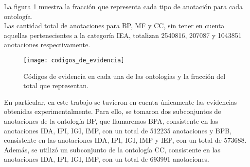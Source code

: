 La figura \ref{fig:codigos_de_evidencia} muestra la fracción que representa cada tipo de anotación para cada ontología.\\
Las cantidad total de anotaciones para BP, MF y CC, sin tener en cuenta aquellas pertenecientes a la categoría IEA, totalizan 2540816, 207087 y 1043851 anotaciones respectivamente.
\begin{figure}[h]
    \centering
    \texttt{[image: codigos\_de\_evidencia]}
    \caption{Códigos de evidencia en cada una de las ontologías y la fracción del total que representan.}
    \label{fig:codigos_de_evidencia}
\end{figure}
En particular, en este trabajo se tuvieron en cuenta únicamente las evidencias obtenidas experimentalmente. Para ello, se tomaron dos subconjuntos de anotaciones de la ontología BP, que llamaremos BPA, consistente en las anotaciones IDA, IPI, IGI, IMP, con un total de 512235 anotaciones y BPB, consistente en las anotaciones IDA, IPI, IGI, IMP y IEP, con un total de 573688. Además, se utilizó un subconjunto de la ontología CC, consistente en las anotaciones IDA, IPI, IGI, IMP, con un total de 693991 anotaciones. \cite{Pandey2008, Resnik1995, Bose2016, Pesquita2009, Berenstein2014, Ashburner}
